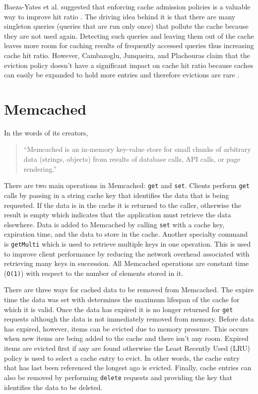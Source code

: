 \documentclass[12pt]{ucthesis}
\begin{document}
Baeza-Yates et al. suggested that enforcing cache admission policies is a valuable way to improve hit ratio \cite{cacheAdmissionPolicies}.
The driving idea behind it is that there are many singleton queries (queries that are run only once) that pollute the cache because they are not used again.
Detecting such queries and leaving them out of the cache leaves more room for caching results of frequently accessed queries thus increasing cache hit ratio.
However, Cambazoglu, Junqueira, and Plachouras claim that the eviction policy doesn't have a significant impact on cache hit ratio because caches can easily be expanded to hold more entries and therefore evictions are rare \cite{refreshingPerspectiveSearch}.


\section{Memcached}
In the words of its creators, \begin{quotation}``Memcached is an in-memory key-value store for small chunks of arbitrary data (strings, objects) from results of database calls, API calls, or page rendering.\cite{memcachedDotOrg}''\end{quotation}
There are two main operations in \textsf{Memcached}: {\tt get} and {\tt set}.
Clients perform {\tt get} calls by passing in a string cache key that identifies the data that is being requested.
If the data is in the cache it is returned to the caller, otherwise the result is empty which indicates that the application must retrieve the data elsewhere.
Data is added to \textsf{Memcached} by calling {\tt set} with a cache key, expiration time, and the data to store in the cache.
Another specialty command is {\tt getMulti} which is used to retrieve multiple keys in one operation.
This is used to improve client performance by reducing the network overhead associated with retrieving many keys in succession.
All \textsf{Memcached} operations are constant time ({\tt O(1)}) with respect to the number of elements stored in it.

There are three ways for cached data to be removed from \textsf{Memcached}.
The expire time the data was set with determines the maximum lifespan of the cache for which it is valid.
Once the data has expired it is no longer returned for {\tt get} requests although the data is not immediately removed from memory.
Before data has expired, however, items can be evicted due to memory pressure.
This occurs when new items are being added to the cache and there isn't any room.
Expired items are evicted first if any are found otherwise the Least Recently Used (LRU) policy is used to select a cache entry to evict.
In other words, the cache entry that has last been referenced the longest ago is evicted.
Finally, cache entries can also be removed by performing {\tt delete} requests and providing the key that identifies the data to be deleted.
\end{document}
